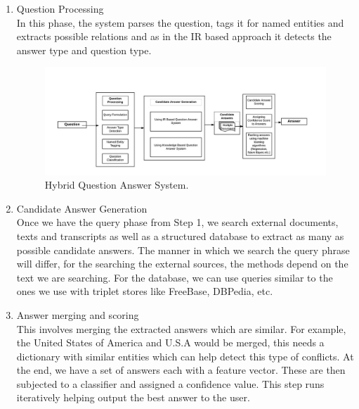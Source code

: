 \begin{enumerate}

\item Question Processing \\
In this phase, the system parses the question, tags it for named entities and extracts possible relations and as in the IR based approach it detects the answer type and question type.

\begin{figure}[htb]
\centering
\includegraphics[scale=0.8]{images/Hybrid_QA.jpg}
\caption{Hybrid Question Answer System.} 
\label{fig:Hybrid_QA}
\end{figure}

\break
\item Candidate Answer Generation \\
Once we have the query phase from Step 1, we search external documents, texts and transcripts as well as a structured database to extract as many as possible candidate answers. The manner in which we search the query phrase will differ, for the searching the external sources, the methods depend on the text we are searching. For the database, we can use queries similar to the ones we use with triplet stores like FreeBase, DBPedia, etc.

\item Answer merging and scoring \\
This involves merging the extracted answers which are similar. For example, the United States of America and U.S.A would be merged, this needs a dictionary with similar entities which can help detect this type of conflicts. At the end, we have a set of answers each with a feature vector. These are then subjected to a classifier and assigned a confidence value. This step runs iteratively helping output the best answer to the user.

 \end{enumerate}